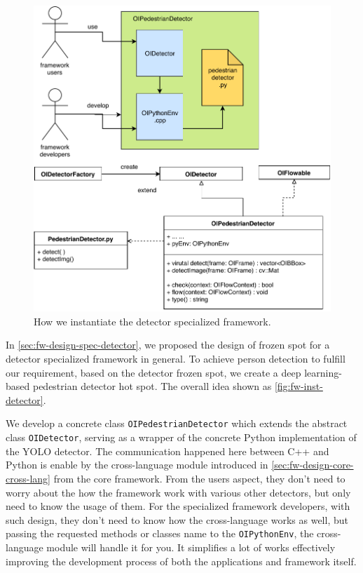 \begin{figure}
    \centering
    \includegraphics[scale=0.8]{figures/framework_inst_detector.pdf}
    \caption{How we instantiate the detector specialized framework.}
    \label{fig:fw-inst-detector}
\end{figure}

In \autoref{sec:fw-design-spec-detector}, we proposed the design of frozen spot
for a detector specialized framework in general. To achieve person
detection to fulfill our requirement, based on the detector frozen spot, we
create a deep learning-based pedestrian detector hot spot. The overall idea
shown as \autoref{fig:fw-inst-detector}.

We develop a concrete class \texttt{OIPedestrianDetector} which extends the
abstract class \texttt{OIDetector}, serving as a wrapper of the concrete Python
implementation of the YOLO detector. The communication happened here between
C++ and Python is enable by the cross-language module introduced in
\autoref{sec:fw-design-core-cross-lang} from the core framework.
From the users aspect, they don't need to worry about the
how the framework work with various other detectors, but only need to know
the usage of them. For the specialized framework developers, 
with such design, they don't need to know how the cross-language works as well, 
but passing the requested methods or classes name to the \texttt{OIPythonEnv}, 
the cross-language module will handle it for you. It simplifies a lot of works
effectively improving the development process of both the applications and
framework itself.

